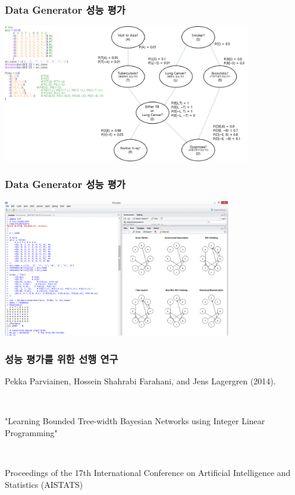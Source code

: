 \documentclass{beamer}
\begin{document}
\begin{frame}
\frametitle{Data Generator 성능 평가}

{\scriptsize{}
	\begin{center}
		\includegraphics[height=170pt]{images/image24}
	\end{center}
}
\end{frame}


\begin{frame}
\frametitle{Data Generator 성능 평가}

{\scriptsize{}
	\begin{center}
		\includegraphics[height=170pt]{images/image23}
	\end{center}
}
\end{frame}



\begin{frame}
\frametitle{성능 평가를 위한 선행 연구}
{\scriptsize{}
Pekka Parviainen, Hossein Shahrabi Farahani, and Jens Lagergren (2014).

{}\

"Learning Bounded Tree-width Bayesian Networks using Integer Linear Programming"

{}\

Proceedings of the 17th International Conference on Artificial Intelligence and Statistics (AISTATS)
}
\end{frame}
\end{document}
